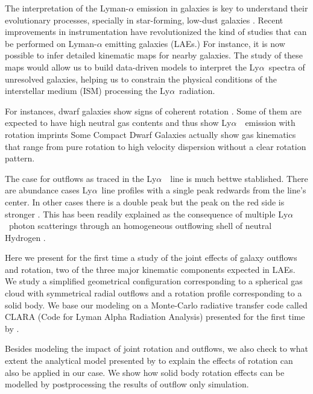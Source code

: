 \documentclass[a4paper,fleqn,usenatbib]{mnras}
\newcommand{\lya}{\ifmmode{{\rm Ly}\alpha}\else Ly$\alpha$\ \fi}
\begin{document}
The interpretation of the Lyman-$\alpha$ emission in galaxies is
key to understand their evolutionary processes, specially in
star-forming, low-dust galaxies \citep{PartridgePeebles}.
Recent improvements in instrumentation have revolutionized the kind of
studies that can be performed on Lyman-$\alpha$ emitting galaxies
(LAEs.)
For instance, it is now possible to infer detailed kinematic maps for
nearby galaxies.
The study of these maps would allow us to build data-driven models to
interpret the \lya spectra of unresolved galaxies, helping us to
constrain the physical conditions of the interstellar medium (ISM)
processing the \lya radiation.


For instances, dwarf galaxies show signs of coherent rotation
\citep{2009A&A...493..871S}.
Some of them are expected to have high neutral gas contents and thus
show \lya\ emission with rotation imprints
\citep{2005A&A...433L...1B,2008ApJ...672..888T,2013MNRAS.434.2491G}
Some Compact Dwarf Galaxies actually show gas kinematics that range
from pure rotation to high velocity dispersion without a clear
rotation pattern.
\citep{2015A&A...577A..21C,2017A&A...600A.125C}


The case for outflows as traced in the \lya\ line is much bettwe
stablished.
There are abundance cases \lya line profiles with a single peak
redwards from the line's center. 
In other cases there is a double peak but the peak on the red side is
stronger \citep[e.g.][]{2010ApJ...717..289S,Erb14,Trainor16}.  
This has been readily explained as the consequence of multiple \lya photon
scatterings through an homogeneous outflowing shell of neutral Hydrogen
\citep{2006A&A...460..397V,Orsi12,2012ApJ...751...29Y,2015ApJ...812..123G}.


Here we present for the first time a study of the joint effects of
galaxy outflows and rotation, two of the three major kinematic
components expected in LAEs.
We study a simplified geometrical configuration corresponding to a
spherical gas cloud with symmetrical radial outflows and a rotation
profile corresponding to a solid body.
We base our modeling on a Monte-Carlo radiative transfer code called
CLARA (Code for Lyman Alpha Radiation Analysis) presented for the
first time by \cite{CLARA}.

Besides modeling the impact of joint rotation and outflows, we also
check to what extent the analytical model presented by
\cite{Garavito14} to explain the effects of rotation can also be
applied in our case.
We show how solid body rotation effects can be modelled by
postprocessing the results of outflow only simulation.
\end{document}
